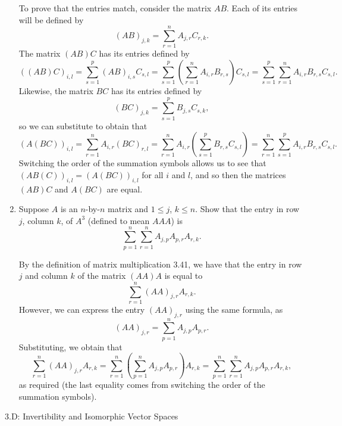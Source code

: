 \documentclass{book}
\begin{document}
\begin{enumerate}
To prove that the entries match, consider the matrix \(AB\).  Each of its entries will be defined by \[(AB)_{j,k}=\sum_{r=1}^n A_{j,r}C_{r,k}.\] The matrix \((AB)C\) has its entries defined by \[((AB)C)_{i,l}=\sum_{s=1}^{p} (AB)_{i,s}C_{s,l}=\sum_{s=1}^{p} \left(\sum_{r=1}^n A_{i,r}B_{r,s}\right)C_{s,l}=\sum_{s=1}^{p} \sum_{r=1}^n A_{i,r}B_{r,s}C_{s,l}.\] Likewise, the matrix \(BC\) has its entries defined by \[(BC)_{j,k}=\sum_{s=1}^p B_{j,s}C_{s,k},\] so we can substitute to obtain that \[(A(BC))_{i,l}= \sum_{r=1}^n A_{i,r}(BC)_{r,l}=\sum_{r=1}^n A_{i,r}\left(\sum_{s=1}^p B_{r,s}C_{s,l}\right)=\sum_{r=1}^n \sum_{s=1}^p A_{i,r}B_{r,s}C_{s,l}.\] Switching the order of the summation symbols allows us to see that \((AB(C))_{i,l}=(A(BC))_{i,l}\) for all \(i\) and \(l\), and so then the matrices \((AB)C\) and \(A(BC)\) are equal.

\item Suppose \(A\) is an \(n\)-by-\(n\) matrix and \(1 \leq j\), \(k \leq n\).  Show that the entry in row \(j\), column \(k\), of \(A^3\) (defined to mean \(AAA\)) is \[\sum_{p=1}^{n} \sum_{r=1}^{n} A_{j,p}A_{p,r}A_{r,k}.\]

By the definition of matrix multiplication 3.41, we have that the entry in row \(j\) and column \(k\) of the matrix \((AA)A\) is equal to \[\sum_{r=1}^{n} (AA)_{j,r} A_{r,k}.\] However, we can express the entry \((AA)_{j,r}\) using the same formula, as \[(AA)_{j,r}=\sum_{p=1}^{n} A_{j,p}A_{p,r}.\] Substituting, we obtain that \[\sum_{r=1}^{n} (AA)_{j,r} A_{r,k}=\sum_{r=1}^{n} \left(\sum_{p=1}^{n} A_{j,p}A_{p,r}\right) A_{r,k}=\sum_{p=1}^{n} \sum_{r=1}^{n} A_{j,p}A_{p,r}A_{r,k},\] as required (the last equality comes from switching the order of the summation symbols).

\end{enumerate}

3.D: Invertibility and Isomorphic Vector Spaces
\end{document}
